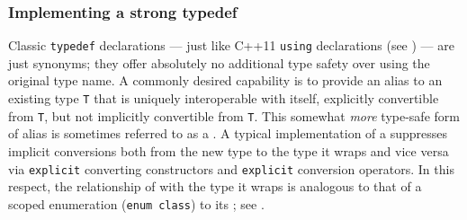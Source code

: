 \subsubsection[Implementing a strong \lstinline!typedef!]{Implementing a strong {\SubsubsecCode typedef}}\label{implementing-a-strong-typedef}

Classic \lstinline!typedef! declarations --- just like C++11
\lstinline!using! declarations (see ) 
--- are just synonyms; they
offer absolutely no additional type safety over using the original type name. A commonly desired capability is to
provide an alias to an existing type \lstinline!T! that is uniquely
interoperable with itself, explicitly convertible from \lstinline!T!, but
not implicitly convertible from \lstinline!T!. This somewhat \emph{more}
type-safe form of alias is sometimes referred to as a . A typical implementation of a  suppresses implicit conversions both from the new type to the type it wraps and vice versa via \lstinline!explicit! converting constructors and \lstinline!explicit! conversion operators.  In this respect, the relationship of  with the type it wraps is analogous to that of a scoped enumeration (\lstinline!enum!~\lstinline!class!)  to its ; see . 

